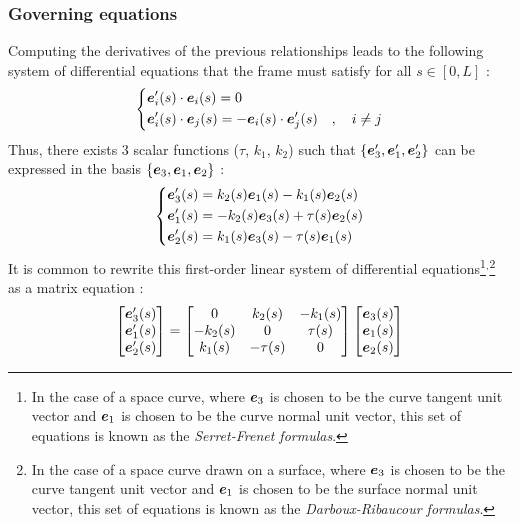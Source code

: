 \subsubsection{Governing equations}
Computing the derivatives of the previous relationships leads to the following system of differential equations that the frame must satisfy for all $s \in [0,L]$ :
\begin{equation}
	\left\{
	\begin{aligned}
		&\boldsymbol{e}'_i(s) \cdot \boldsymbol{e}_i(s) = 0 \\
		&\boldsymbol{e}'_{i}(s) \cdot \boldsymbol{e}_{j}(s) = -\boldsymbol{e}_{i}(s) \cdot \boldsymbol{e}'_{j}(s)\quad , \quad i \neq j
	\end{aligned}
	\right.
\end{equation}
Thus, there exists 3 scalar functions ($\tau$, $k_{1}$, $k_{2}$) such that $\{\boldsymbol{e}'_{3}, \boldsymbol{e}'_{1}, \boldsymbol{e}'_{2}\}$ can be expressed in the basis $\{\boldsymbol{e}_{3}, \boldsymbol{e}_{1}, \boldsymbol{e}_{2}\}$ :
\begin{equation}
	\left\{
	\begin{aligned}
		&\boldsymbol{e}'_{3}(s) = k_{2}(s)\boldsymbol{e}_{1}(s) - k_{1}(s)\boldsymbol{e}_{2}(s) \\
		&\boldsymbol{e}'_{1}(s) = -k_{2}(s)\boldsymbol{e}_{3}(s) + \tau(s)\boldsymbol{e}_{2}(s) \\
		&\boldsymbol{e}'_{2}(s) = k_{1}(s)\boldsymbol{e}_{3}(s) - \tau(s)\boldsymbol{e}_{1}(s)
	\end{aligned}
	\right.
\end{equation}
It is common to rewrite this first-order linear system of differential equations\footnote{In the case of a space curve, where $\boldsymbol{e}_3$ is chosen to be the curve tangent unit vector and $\boldsymbol{e}_1$ is chosen to be the curve normal unit vector, this set of equations is known as the \emph{Serret-Frenet formulas}.}${}^,$\footnote{In the case of a space curve drawn on a surface, where $\boldsymbol{e}_3$ is chosen to be the curve tangent unit vector and $\boldsymbol{e}_1$ is chosen to be the surface normal unit vector, this set of equations is known as the \emph{Darboux-Ribaucour formulas}.
} 
as a matrix equation :
\begin{equation}
	\begin{bmatrix}
		\boldsymbol{e}'_{3}(s) \\
		\boldsymbol{e}'_{1}(s) \\
		\boldsymbol{e}'_{2}(s)
	\end{bmatrix}
	=
	\begin{bmatrix}
		0 & k_{2}(s) & -k_{1}(s) \\
		-k_{2}(s) & 0 & \tau(s) \\
		k_{1}(s) & -\tau(s) & 0
	\end{bmatrix}
	\begin{bmatrix}
		\boldsymbol{e}_{3}(s) \\
		\boldsymbol{e}_{1}(s) \\
		\boldsymbol{e}_{2}(s)
	\end{bmatrix}
\label{eq:movingframe}
\end{equation}
